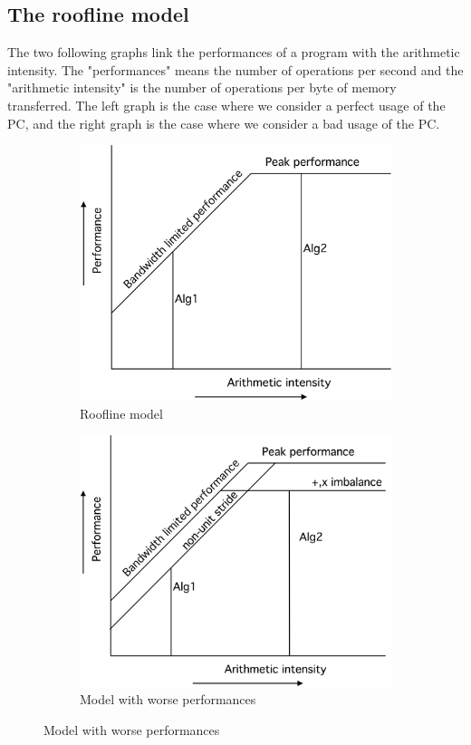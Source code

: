 \documentclass[12pt, openany]{report}
\theoremstyle{definition}
\begin{document}
\subsection{The roofline model}
The two following graphs link the performances of a program with the arithmetic intensity. The "performances" means the number of operations per second and the "arithmetic intensity" is the number of operations per byte of memory transferred. The left graph is the case where we consider a perfect usage of the PC, and the right graph is the case where we consider a bad usage of the PC.  
\begin{figure}[H]
	\begin{subfigure}[b]{0.45\textwidth}
		\centering
		\includegraphics[scale=0.10]{img/roofline.jpeg}
		\caption{Roofline model}
		\label{fig:roofline}
	\end{subfigure}
	\begin{subfigure}[b]{0.45\textwidth}
		\centering
		\includegraphics[scale=0.10]{img/roofline2.jpeg}
		\caption{Model with worse performances}
		\label{fig:roofline2}
	\end{subfigure}
\end{figure}
\end{document}
